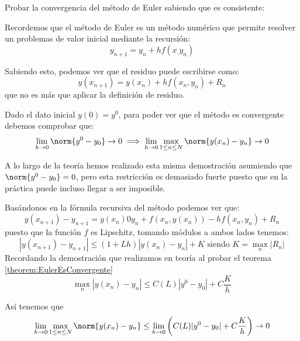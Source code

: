 \begin{problem}[1]
Probar la convergencia del método de Euler sabiendo que es consistente:

\solution

Recordemos que el método de Euler es un método numérico que permite resolver un problemas de valor inicial mediante la recursión:
\[y_{n+1} = y_n + hf(x_,y_n)\]

Sabiendo esto, podemos ver que el residuo puede escribirse como:
\[y(x_{n+1}) = y(x_n) + hf(x_n,y_n) + R_n\]
que no es más que aplicar la definición de residuo.

Dado el dato inicial $y(0)=y^0$, para poder ver que el método es convergente debemos comprobar que:
\[\lim_{h \to 0 } \norm{y^0-y_0} \to 0 \implies \lim_{h\to 0} \max_{1 \leq n \leq N}\norm{y(x_n)-y_n} \to 0\]

\obs A lo largo de la teoría hemos realizado esta misma demostración asumiendo que $\norm{y^0-y_0} = 0$, pero esta restricción es demasiado fuerte puesto que en la práctica puede incluso llegar a ser imposible.

Basándonos en la fórmula recursiva del método podemos ver que:
\[y(x_{n+1}) - y_{n+1} = y(x_n) 0 y_n + f(x_n,y(x_n)) -hf(x_n,y_n) + R_n\]
puesto que la función $f$ es Lipschitz, tomando módulos a ambos lados tenemos:
\[|y(x_{n+1})-y_{n+1}| \leq (1+Lh)|y(x_n)-y_n| + K \text{ siendo }K=\max_n|R_n|\]
Recordando la demostración que realizamos en teoría al probar el teorema \ref{theorem:EulerEsConvergente}
\[\max_n|y(x_n)-y_n| \leq C(L)|y^0-y_0|+C\frac{K}{h}\]

Así tenemos que 
\[\lim_{h\to 0} \max_{1 \leq n \leq N}\norm{y(x_n)-y_n} \leq \lim_{h \to 0}\left( C(L)|y^0-y_0|+C\frac{K}{h}\right) \to 0\]
\end{problem}

